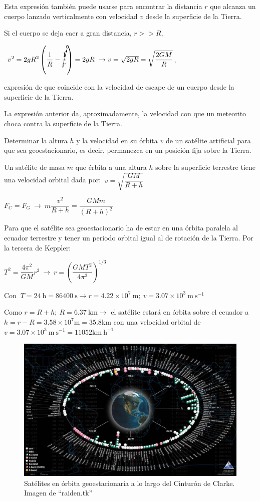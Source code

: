 Esta expresión también puede usarse para encontrar la distancia $r$ que alcanza un cuerpo lanzado verticalmente con velocidad $v$ desde la superficie de la Tierra.

Si el cuerpo se deja caer a gran distancia, $r>>R$, 

$\ v^2=2gR^2\left( \dfrac 1 R - \cancelto{0}{\dfrac 1 r} \right)=2gR\ \to v=\sqrt{2gR}=\sqrt{\dfrac{2GM}{R}}$,

expresión de que coincide con la velocidad de escape de un cuerpo desde la superficie de la Tierra.

La expresión anterior da, aproximadamente, la velocidad con que un meteorito choca contra la superficie de la Tierra.


\begin{prob}
Determinar la altura $h$	 y la velocidad en su órbita $v$ de un satélite artificial para que sea geoestacionario, es decir, permanezca en un posición fija sobre la Tierra.
\end{prob}


Un satélite de masa $m$ que érbita a una altura $h$ sobre la superficie terrestre tiene una velocidad orbital dada por: 
$\ v=\sqrt{\dfrac{GM}{R+h}}$

\textcolor{gris}{$F_C=F_G \ \to \ m \dfrac {v^2}{R+h}=\dfrac{GMm}{(R+h)^2}$}

Para que el satélite sea geoestacionario ha de estar en una órbita paralela al ecuador terrestre y tener un periodo orbital igual al de rotación de la Tierra. Por la tercera de Keppler:

$T^2=\dfrac{4\pi^2}{GM} r^3 \ \to \ r=\left(\dfrac{GMT^2}{4\pi^2} \right)^{1/3}$

Con $\ T=24\ \mathrm{h}=86400\ \mathrm{s} \to r=4.22\times 10^{7}\ \mathrm{m};\ v=3.07\times 10^{3}\ \mathrm{m\ s}^{-1}$  

Como $r=R+h; \ R=6.37 \ \mathrm{km} \to$ el satélite estará en órbita sobre el ecuador a $h=r-R=3.58\times 10^7 \mathrm{m}=35.8 \mathrm{km}$ con una velocidad orbital de $v=3.07\times 10^{3}\ \mathrm{m\ s}^{-1}=11052 \mathrm{km\ h}^{-1}$
\begin{figure}[H]
	\centering
	\includegraphics[width=.9\textwidth]{imagenes/imagenes15/T15IM10.png}
	\caption*{Satélites en órbita geoestacionaria a lo largo del Cinturón de Clarke. Imagen de ``raiden.tk''  }
\end{figure}

